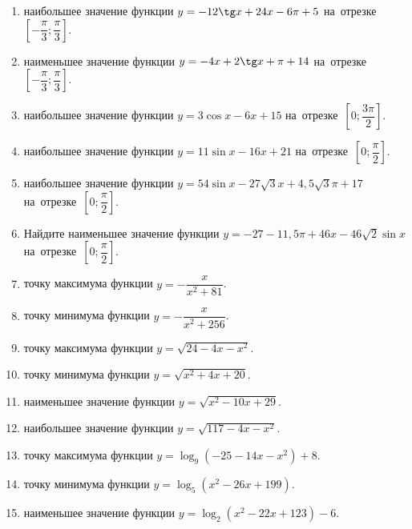 \documentclass[a4paper,10pt]{article}
\begin{document}
\begin{enumerate}
\item {} наибольшее значение функции $y=-12\tg x +24x-6\pi +5$ на~отрезке~$\left[-\dfrac{\pi}{3};\dfrac{\pi}{3}\right]$.

\item {} наименьшее значение функции $y=-4x +2\tg x+\pi+14$ на~отрезке~$\left[-\dfrac{\pi}{3};\dfrac{\pi}{3}\right]$.

\item {} наибольшее значение функции $y=3\cos x-6x+15$ на~отрезке~$\left[0;\dfrac{3\pi}{2}\right]$.

\item {} наибольшее значение функции $y=11\sin x-16x+21$ на~отрезке~$\left[0;\dfrac{\pi}{2}\right]$.

\item {} наибольшее значение функции $y=54\sin x-27\sqrt{3}x+4,5\sqrt{3}\pi +17$ на~отрезке~$\left[0;\dfrac{\pi}{2}\right]$.

\item Найдите наименьшее значение функции $y=-27-11,5\pi+46x-46\sqrt{2}\sin x$ на~отрезке~$\left[0;\dfrac{\pi}{2}\right]$.

\item {} точку максимума функции $y=-\dfrac{x}{ x^2 +81}$.

\item {} точку минимума функции $y=-\dfrac{x}{ x^2 +256}$.

\item {} точку максимума функции $y=\sqrt{24-4x-x^2}$.

\item {} точку минимума функции $y=\sqrt{x^2+4x+20}$.

\item {} наименьшее значение функции $y=\sqrt{x^2-10x+29}$.

\item {} наибольшее значение функции $y=\sqrt{117-4x-x^2}$.

\item {} точку максимума функции $y=\log_9\left(-25-14x-x^2\right)+8$.

\item {} точку минимума функции $y=\log_5\left(x^2-26x+199\right)$.

\item {} наименьшее значение функции $y=\log_2\left(x^2-22x+123\right)-6$.


\end{enumerate}
\end{document}
